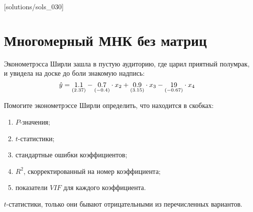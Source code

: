 [solutions/sols_030]

\chapter{Многомерный МНК без матриц}



\begin{problem} %
 Эконометрэсса Ширли зашла в пустую аудиторию, где царил приятный полумрак, и увидела на доске до боли знакомую надпись:
\[
\hat{y}=\underset{(2.37)}{1.1}-\underset{(-0.4)}{0.7}\cdot x_2+\underset{(3.15)}{0.9}\cdot x_3-\underset{(-0.67)}{19}\cdot x_4
\]

Помогите эконометрэссе Ширли определить, что находится в скобках:
\begin{enumerate}
\item $P$-значения;
\item $t$-статистики;
\item стандартные ошибки коэффициентов;
\item $R^2$, скорректированный на номер коэффициента;
\item показатели $VIF$ для каждого коэффициента.
\end{enumerate}


\begin{sol}
$t$-статистики, только они бывают отрицательными из перечисленных вариантов.
\end{sol}
\end{problem}



